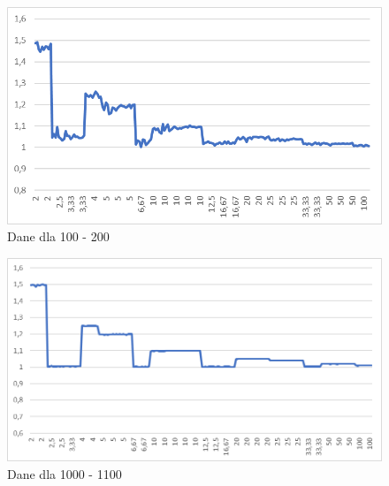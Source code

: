 \begin{figure}[h]
    \centering
    \includegraphics[scale=0.4]{100a200.png}
    \caption{Dane dla 100 - 200}
    \label{100-200}
\end{figure}

\begin{figure}[h]
    \centering
    \includegraphics[scale=0.33]{1000a1100.png}
    \caption{Dane dla 1000 - 1100}
    \label{1100-1000}
\end{figure}
